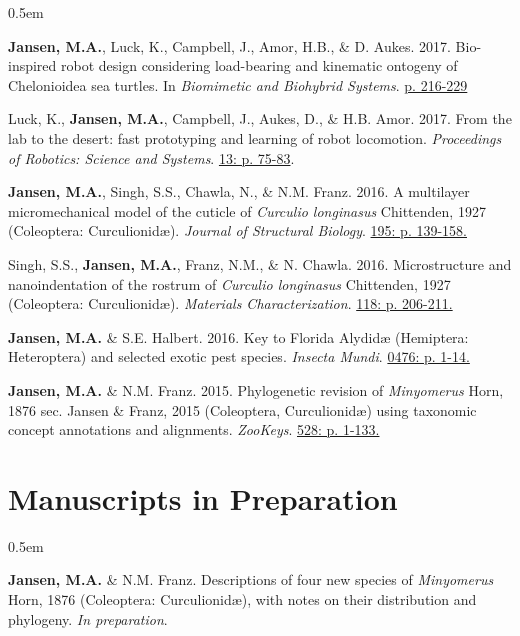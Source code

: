 \documentclass[12pt,a4paper]{article}
\begin{document}
	\begin{description}
		\itemsep0.5em
		\item \textbf{Jansen, M.A.}, Luck, K., Campbell, J., Amor, H.B., \& D. Aukes. 2017. Bio-inspired robot design considering load-bearing and kinematic ontogeny of Chelonioidea sea turtles. In \textit{Biomimetic and Biohybrid Systems}. \href{http://www.springer.com/us/book/9783319635361}{p. 216-229}
		\item Luck, K., \textbf{Jansen, M.A.}, Campbell, J., Aukes, D., \& H.B. Amor. 2017. From the lab to the desert: fast prototyping and learning of robot locomotion. \textit{Proceedings of Robotics: Science and Systems}. \href{http://www.roboticsproceedings.org/rss13/p75.html}{13: p. 75-83}.
		\item \textbf{Jansen, M.A.}, Singh, S.S., Chawla, N., \& N.M. Franz. 2016. A multilayer micromechanical model of the cuticle of \textit{Curculio longinasus} Chittenden, 1927 (Coleoptera: Curculionid\ae). \textit{Journal of Structural Biology}. \href{http://www.sciencedirect.com/science/article/pii/S1047847716300922}{195: p. 139-158.}
		\item Singh, S.S., \textbf{Jansen, M.A.}, Franz, N.M., \& N. Chawla. 2016. Microstructure and nanoindentation of the rostrum of \textit{Curculio longinasus} Chittenden, 1927 (Coleoptera: Curculionid\ae). \textit{Materials Characterization}. \href{http://www.sciencedirect.com/science/article/pii/S1044580316301619}{118: p. 206-211.}
		\item \textbf{Jansen, M.A.} \& S.E. Halbert. 2016. Key to Florida Alydid{\ae} (Hemiptera: Heteroptera) and selected exotic pest species. \textit{Insecta Mundi}. \href{http://journals.fcla.edu/mundi/article/view/87952/84644}{0476: p. 1-14.}
		\item \textbf{Jansen, M.A.} \& N.M. Franz. 2015. Phylogenetic revision of \textit{Minyomerus} Horn, 1876 sec. Jansen \& Franz, 2015 (Coleoptera, Curculionid\ae) using taxonomic concept annotations and alignments. \textit{ZooKeys}. \href{http://zookeys.pensoft.net/articles.php?id=6001}{528: p. 1-133.}
	\end{description}

\section*{Manuscripts in Preparation}

	\begin{description}
		\itemsep0.5em
		\item \textbf{Jansen, M.A.} \& N.M. Franz. Descriptions of four new species of \textit{Minyomerus} Horn, 1876 (Coleoptera: Curculionid\ae), with notes on their distribution and phylogeny. \textit{In preparation}.
	\end{description}
\end{document}
